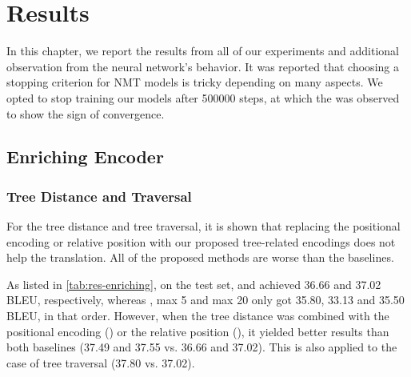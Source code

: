 \chapter{Results}
\label{result}

In this chapter, we report the results from all of our experiments and additional observation from the neural network's behavior.
It was reported that choosing a stopping criterion for NMT models is tricky \citep{TrainingTipsfortheTransformerModel} depending on many aspects.
We opted to stop training our models after 500000 steps, at which the \transformerbase was observed to show the sign of convergence.

\section{Enriching Encoder}
\label{result-enriching}


\subsection{Tree Distance and Traversal}

For the tree distance and tree traversal, it is shown that replacing the positional encoding or relative position with our proposed tree-related encodings does not help the translation.
All of the proposed methods are worse than the baselines.

As listed in \cref{tab:res-enriching}, on the test set, \transformerbase and \transformerrel achieved 36.66 and 37.02 BLEU, respectively, whereas \TreeTraversal, \TreeDistance max 5 and max 20 only got 35.80, 33.13 and 35.50 BLEU, in that order. However, when the tree distance was combined with the positional encoding (\transformerbase) or the relative position (\transformerrel), it yielded better results than both baselines (37.49 and 37.55 vs. 36.66 and 37.02). This is also applied to the case of tree traversal (37.80 vs. 37.02).

